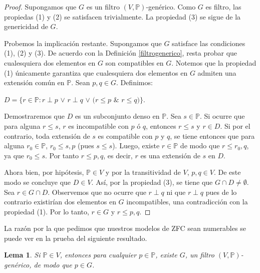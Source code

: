 \documentclass[11pt]{unam_tesis1}
\theoremstyle{MyThmStyle}
\theoremstyle{definition}
\theoremstyle{plain}
\newtheorem{lemma}[definition]{Lema}
\theoremstyle{remark}
\let\leq\leqslant
\begin{document}
\begin{proof}
Supongamos que $G$ es un filtro $(V,\mathbb P)$-gen\'erico. Como $G$ es filtro, las propiedas (1) y (2) se satisfacen trivialmente. La propiedad (3) se sigue de la genericidad de $G$.

Probemos la implicaci\'on restante. Supongamos que $G$ satisface las condiciones (1), (2) y (3). De acuerdo con la Definici\'on \ref{filtrogenerico}, resta probar que cualesquiera dos elementos en $G$ son compatibles en $G$. Notemos que la propiedad (1) \'unicamente garantiza que cualesquiera dos elementos en $G$ admiten una extensi\'on com\'un en $\mathbb P$. Sean $p,q\in G$. Definimos:

\begin{center}
$D=\{r\in  \mathbb P: r\perp p$ $\vee$ $r\perp q$ $\vee$ $(r\leq p$ $\&$ $r\leq q) \}$.
\end{center}

Demostraremos que $D$ es un subconjunto denso en $\mathbb P$. Sea $s\in \mathbb P$. Si ocurre que para alguna $r\leq s$, $r$ es incompatible con $p$ \'o $q$, entonces $r\leq s$ y $r\in D$. Si por el contrario, toda extensi\'on de $s$ es compatible con $p$ y $q$, se tiene entonces que para alguna $r_0\in \mathbb P$, $r_0\leq s,p$ (pues $s\leq s$). Luego, existe $r\in \mathbb P$ de modo que $r\leq r_0,q$, ya que $r_0 \leq s$. Por tanto $r\leq p,q$, es decir, $r$ es una extensi\'on de $s$ en $D$.

Ahora bien, por hip\'otesis, $\mathbb P\in V$ y por la transitividad de $V$, $p,q\in V$. De este modo se concluye que $D\in V$. As\'i, por la propiedad (3), se tiene que $G\cap D\neq \emptyset$. Sea $r\in G\cap D$. Observemos que no ocurre que $r\perp q$ ni que $r\perp q$ pues de lo contrario existir\'ian dos elementos en $G$ incompatibles, una contradicci\'on con la propiedad (1). Por lo tanto, $r\in G$ y $r\leq p,q$.
\end{proof}

La raz\'on por la que pedimos que nuestros modelos de ZFC sean numerables se puede ver en la prueba del siguiente resultado.

\begin{lemma}\label{condicionenG}
Si $\mathbb P\in V$, entonces para cualquier $p\in \mathbb P$, existe $G$, un filtro $(V,\mathbb P)$-gen\'erico, de modo que $p\in G$.
\end{lemma}
\end{document}
